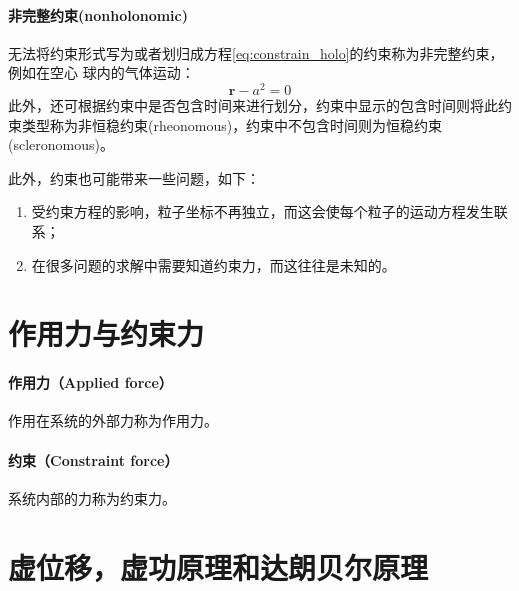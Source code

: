 \paragraph*{非完整约束(nonholonomic)}
无法将约束形式写为或者划归成方程\eqref{eq:constrain_holo}的约束称为非完整约束，例如在空心
球内的气体运动：
\begin{equation*}
	\bm{r} - a^2 = 0
\end{equation*} 
此外，还可根据约束中是否包含时间来进行划分，约束中显示的包含时间则将此约束类型称为非恒稳约束(rheonomous)，约束中不包含时间则为恒稳约束(scleronomous)。

此外，约束也可能带来一些问题，如下：
\begin{enumerate}
	\item 受约束方程的影响，粒子坐标不再独立，而这会使每个粒子的运动方程发生联系；
	\item 在很多问题的求解中需要知道约束力，而这往往是未知的。
\end{enumerate}

\section{作用力与约束力}
\paragraph*{作用力（Applied force）}
作用在系统的外部力称为作用力。

\paragraph*{约束（Constraint force）}
系统内部的力称为约束力。

\section{虚位移，虚功原理和达朗贝尔原理}

